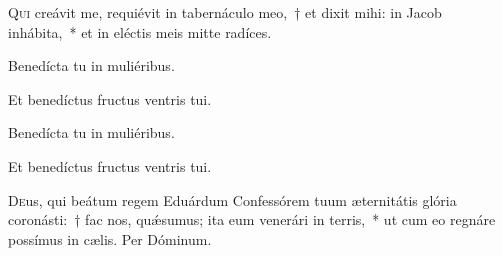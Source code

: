 \documentclass[vesperale_romanum.tex]{subfiles}
\begin{document}



\lettrine{Q}{ui} creávit me, requiévit in tabernáculo meo,~† et dixit mihi: in Jacob inhábita,~* et in eléctis meis mitte radíces.


\vv Benedícta tu in muliéribus.

\rr Et benedíctus fructus ventris tui.

\admagnificat



\oratio






\vv Benedícta tu in muliéribus.

\rr Et benedíctus fructus ventris tui.

\admagnificat


\myrule


\semiduplexmtv

\oratio

\lettrine{D}{e}us, qui beátum regem Eduárdum Confessórem tuum æternitátis glória coronásti:~† fac nos, quǽsumus; ita eum venerári in terris,~* ut cum eo regnáre possímus in cælis. Per Dóminum.

\vespsequentiscomm

\myrule

\newpage


\duplex
\end{document}
